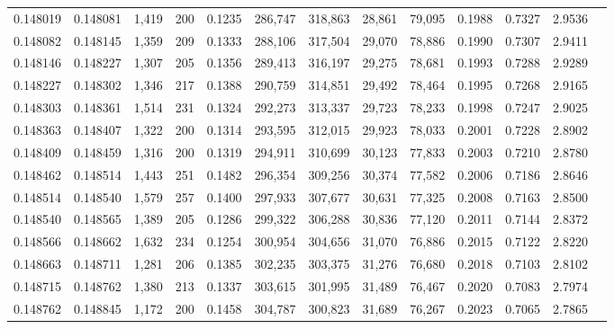 \begin{tabular}{rrrrrrrrrrrrr}
0.148019 & 0.148081 & 1,419 & 200 &                                     0.1235 & 286,747 & 318,863 &  28,861 &  79,095 & 0.1988 & 0.7327 & 2.9536 \\
0.148082 & 0.148145 & 1,359 & 209 &                                     0.1333 & 288,106 & 317,504 &  29,070 &  78,886 & 0.1990 & 0.7307 & 2.9411 \\
0.148146 & 0.148227 & 1,307 & 205 &                                     0.1356 & 289,413 & 316,197 &  29,275 &  78,681 & 0.1993 & 0.7288 & 2.9289 \\
0.148227 & 0.148302 & 1,346 & 217 &                                     0.1388 & 290,759 & 314,851 &  29,492 &  78,464 & 0.1995 & 0.7268 & 2.9165 \\
0.148303 & 0.148361 & 1,514 & 231 &                                     0.1324 & 292,273 & 313,337 &  29,723 &  78,233 & 0.1998 & 0.7247 & 2.9025 \\
0.148363 & 0.148407 & 1,322 & 200 &                                     0.1314 & 293,595 & 312,015 &  29,923 &  78,033 & 0.2001 & 0.7228 & 2.8902 \\
0.148409 & 0.148459 & 1,316 & 200 &                                     0.1319 & 294,911 & 310,699 &  30,123 &  77,833 & 0.2003 & 0.7210 & 2.8780 \\
0.148462 & 0.148514 & 1,443 & 251 &                                     0.1482 & 296,354 & 309,256 &  30,374 &  77,582 & 0.2006 & 0.7186 & 2.8646 \\
0.148514 & 0.148540 & 1,579 & 257 &                                     0.1400 & 297,933 & 307,677 &  30,631 &  77,325 & 0.2008 & 0.7163 & 2.8500 \\
0.148540 & 0.148565 & 1,389 & 205 &                                     0.1286 & 299,322 & 306,288 &  30,836 &  77,120 & 0.2011 & 0.7144 & 2.8372 \\
0.148566 & 0.148662 & 1,632 & 234 &                                     0.1254 & 300,954 & 304,656 &  31,070 &  76,886 & 0.2015 & 0.7122 & 2.8220 \\
0.148663 & 0.148711 & 1,281 & 206 &                                     0.1385 & 302,235 & 303,375 &  31,276 &  76,680 & 0.2018 & 0.7103 & 2.8102 \\
0.148715 & 0.148762 & 1,380 & 213 &                                     0.1337 & 303,615 & 301,995 &  31,489 &  76,467 & 0.2020 & 0.7083 & 2.7974 \\
0.148762 & 0.148845 & 1,172 & 200 &                                     0.1458 & 304,787 & 300,823 &  31,689 &  76,267 & 0.2023 & 0.7065 & 2.7865 \\

\end{tabular}
